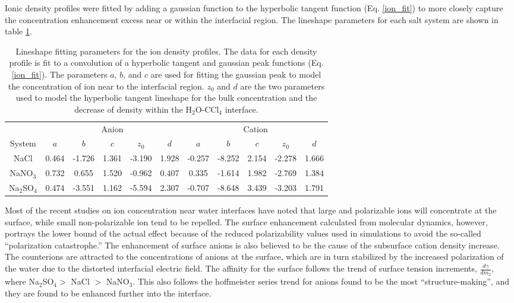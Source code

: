 Ionic density profiles were fitted by adding a gaussian function to the hyperbolic tangent function (Eq. \ref{ion_fit}) to more closely capture the concentration enhancement excess near or within the interfacial region. The lineshape parameters for each salt system are shown in table \ref{ion_params}.

\begin{table}[htdp]
	\begin{center}
	\begin{tabular}{c|c|c|c|c|c|c|c|c|c|c|}
		\cline{2-11}
		\multicolumn{1}{c|}{} & \multicolumn{5}{c}{Anion} & \multicolumn{5}{|c|}{Cation} \\ 
		\cline{1-11}
		\multicolumn{1}{|c|}{System} & $a$ & $b$ & $c$ & $z_0$ & $d$ & $a$ & $b$ & $c$ & $z_0$ & $d$ \\ \hline
		\multicolumn{1}{|c|}{NaCl} & 0.464 & -1.726 & 1.361 & -3.190 & 1.928 & -0.257 & -8.252 & 2.154 & -2.278 & 1.666 \\ \hline
		\multicolumn{1}{|c|}{NaNO$_3$} & 0.732 & 0.655 & 1.520 & -0.962 & 0.407 & 0.335 & -1.614 & 1.982 & -2.769 & 1.384 \\ \hline
		\multicolumn{1}{|c|}{Na$_2$SO$_4$} & 0.474 & -3.551 & 1.162 & -5.594 & 2.307 & -0.707 & -8.648 & 3.439 & -3.203 & 1.791 \\ \hline
	\end{tabular}
	\end{center}
	\caption{Lineshape fitting parameters for the ion density profiles. The data for each density profile is fit to a convolution of a hyperbolic tangent and gaussian peak functions (Eq. \ref{ion_fit}). The parameters $a$, $b$, and $c$ are used for fitting the gaussian peak to model the concentration of ion near to the interfacial region. $z_0$ and $d$ are the two parameters used to model the hyperbolic tangent lineshape for the bulk concentration and the decrease of density within the H$_2$O-CCl$_4$ interface.}
	\label{ion_params}
\end{table}

Most of the recent studies on ion concentration near water interfaces have noted that large and polarizable ions will concentrate at the surface,\cite{Petersen2005b,Pegram2006,Sloutskin2007,Eggimann2008} while small non-polarizable ion tend to be repelled. The surface enhancement calculated from molecular dynamics, however, portrays the lower bound of the actual effect because of the reduced polarizability values used in simulations to avoid the so-called ``polarization catastrophe.'' The enhancement of surface anions is also believed to be the cause of the subsurface cation density increase. The counterions are attracted to the concentrations of anions at the surface, which are in turn stabilized by the increased polarization of the water due to the distorted interfacial electric field. The affinity for the surface follows the trend of surface tension increments, $\frac{d\gamma}{dm_2}$, where Na$_2$SO$_4 >$ NaCl $>$ NaNO$_3$.\cite{Pegram2006} This also follows the hoffmeister series trend for anions found to be the most ``structure-making'', and they are found to be enhanced further into the interface.
